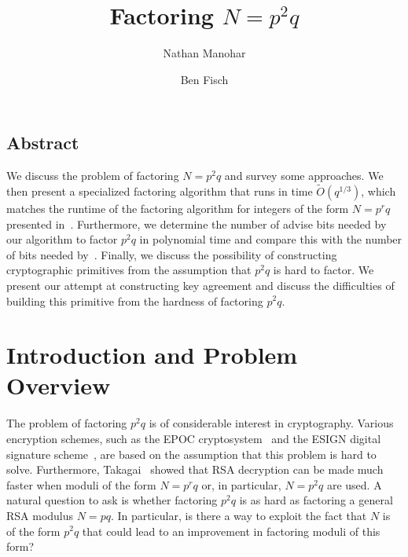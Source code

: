 \documentclass[letterpaper,twocolumn,10pt]{article}
\begin{document}
\date{}

\title{\Large \bf Factoring $N = p^2 q$}

\author{
{\rm Nathan Manohar}\\
\and
{\rm Ben Fisch}\\
} %

\maketitle

\thispagestyle{empty}


\subsection*{Abstract}

We discuss the problem of factoring $N = p^2 q$ and survey some approaches. We then present a specialized factoring algorithm that runs in time $\tilde{O}(q^{1/3})$, which matches the runtime of the factoring algorithm for integers of the form $N = p^r q$ presented in~\cite{dan}. Furthermore, we determine the number of advise bits needed by our algorithm to factor $p^2 q$ in polynomial time and compare this with the number of bits needed by~\cite{dan}. Finally, we discuss the possibility of constructing cryptographic primitives from the assumption that $p^2 q$ is hard to factor. We present our attempt at constructing key agreement and discuss the difficulties of building this primitive from the hardness of factoring $p^2 q$.

\section{Introduction and Problem Overview}

The problem of factoring $p^2 q$ is of considerable interest in cryptography. Various encryption schemes, such as the EPOC cryptosystem~\cite{Okamoto} and the ESIGN digital signature scheme~\cite{esign}, are based on the assumption that this problem is hard to solve. Furthermore, Takagai~\cite{Takagai} showed that RSA decryption can be made much faster when moduli of the form $N = p^r q$ or, in particular, $N = p^2 q$ are used. A natural question to ask is whether factoring $p^2q$ is as hard as factoring a general RSA modulus $N = pq$. In particular, is there a way to exploit the fact that $N$ is of the form $p^2q$ that could lead to an improvement in factoring moduli of this form? 
\end{document}
